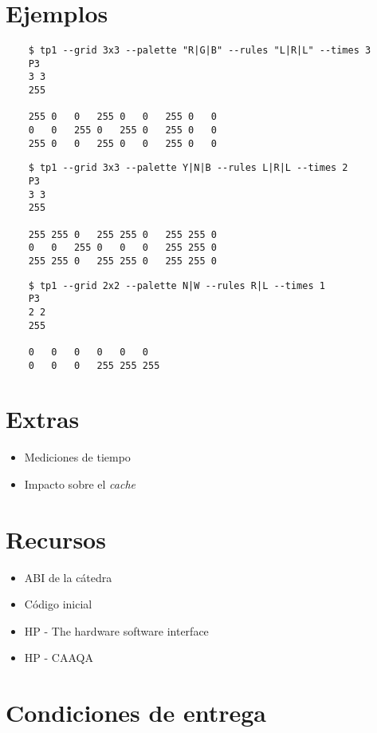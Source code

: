 \documentclass{article}
\begin{document}
\section{Ejemplos}

    \begin{verbatim}
    $ tp1 --grid 3x3 --palette "R|G|B" --rules "L|R|L" --times 3
    P3
    3 3
    255

    255 0   0   255 0   0   255 0   0
    0   0   255 0   255 0   255 0   0 
    255 0   0   255 0   0   255 0   0
    \end{verbatim}

    \begin{verbatim}
    $ tp1 --grid 3x3 --palette Y|N|B --rules L|R|L --times 2
    P3
    3 3
    255

    255 255 0   255 255 0   255 255 0
    0   0   255 0   0   0   255 255 0
    255 255 0   255 255 0   255 255 0
    \end{verbatim}

    \begin{verbatim}
    $ tp1 --grid 2x2 --palette N|W --rules R|L --times 1
    P3
    2 2
    255

    0   0   0   0   0   0 
    0   0   0   255 255 255
    \end{verbatim}

\section{Extras}
\begin{itemize}
\item Mediciones de tiempo
\item Impacto sobre el \textit{cache}
\end{itemize}

\section{Recursos}

\begin{itemize}
\item ABI de la cátedra
\item Código inicial
\item HP - The hardware software interface
\item HP - CAAQA
\end{itemize}

\section{Condiciones de entrega}
\end{document}
